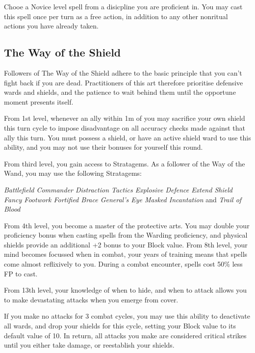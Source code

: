 {{Chooe a Novice level spell from a disicpline you are proficient in. You may cast this spell once per turn as a free action, in addition to any other non\minus{}ritual actions you have already taken.
}

\subsection{\bf The Way of the Shield}

Followers of The Way of the Shield adhere to the basic principle that you can't fight back if you are dead. Practitioners of this art therefore prioritise defensive wards and shields, and the patience to wait behind them until the opportune moment presents itself. 


From 1st level, whenever an ally within 1m of you may sacrifice your own shield this turn cycle to impose disadvantage on all accuracy checks made against that ally this turn. You must possess a shield, or have an active shield ward to use this ability, and you may not use their bonuses for yourself this round. 



From third level, you gain access to Stratagems. As a follower of the Way of the Wand, you may use the following Stratagems:

{\it 
Battlefield Commander\comma{} Distraction Tactics\comma{} Explosive Defence\comma{} Extend Shield\comma{} Fancy Footwork\comma{} Fortified Brace\comma{} General’s Eye\comma{} Masked Incantation } and {\it Trail of Blood
}

{
	From 4th level, you become a master of the protective arts. 	You may double your proficiency bonus when casting spells from the Warding proficiency, and physical shields provide an additional +2 bonus to your Block value. 
}
{
	From 8th level, your mind becomes focussed when in combat, your years of training means that spells come almost reflixively to you. During a combat encounter, spells cost 50\% less FP to cast. 
}
{
	From 13th level, your knowledge of when to hide, and when to attack allows you to make devastating attacks when you emerge from cover.  
	
	If you make no attacks for 3 combat cycles, you may use this ability to deactivate all wards, and drop your shields for this cycle, setting your Block value to its default value of 10. In return, all attacks you make are considered critical strikes until you either take damage, or re\minus{}establish your shields. 
}

}
